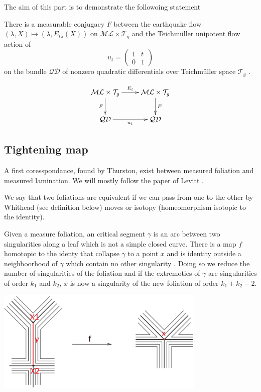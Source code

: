 The aim of this part is to demonstrate the followoing statement

\begin{thm}
\label{MirThm}
There is a measurable conjugacy $F$ between the earthquake flow $(\lambda , X) \mapsto (\lambda, E_{t \lambda}(X))$ on $\mathcal{ML}\times \mathcal{T}_g $ and the Teichmüller unipotent flow action of \[
u_t = \begin{pmatrix} 1 & t \\ 0 & 1 \end{pmatrix}
\]
on the bundle $\mathcal{QD}$ of nonzero quadratic differentials over Teichmüller space $\mathcal{T}_g$ .
\end{thm}

\[
\xymatrix{
  \mathcal{ML}\times \mathcal{T}_g  \ar[r]^{E_t} \ar[d]_F  & \mathcal{ML}\times \mathcal{T}_g \ar[d]^F \\
   \mathcal{QD} \ar[r]_{u_t} & \mathcal{QD}
 }
\]

\subsection{Tightening map}%

A first coresspondance, found by Thurston, exist between measured foliation and measured lamination. We will mostly follow the paper of Levitt \cite{levittfoliations}.

\begin{dfnt}
We say that two foliations are equivalent if we can pass from one to the other by Whithead (see definition below) moves or isotopy (homeomorphism isotopic to the identity).
\end{dfnt}


\begin{dfnt}
Given a measure foliation, an critical segment $\gamma$ is an arc between two singularities along a leaf which is not a simple closed curve.
There is a map $f$ homotopic to the identy that collapse $\gamma$ to a point $x$ and is identity outside a neighboorhood of $\gamma$ which contain no other singularity .  Doing so we reduce the number of singularities of the foliation and if the extremoties of $\gamma$ are singularities of order $k_1$ and $k_2$, $x$ is now a singularity of the new foliation of order $k_1+k_2-2$.
\end{dfnt}


\begin{center}
\includegraphics[width=10cm]{Image/Whitehead-move-collapsing-or-creating-an-arc-joining-two-singular-points.png}
\end{center}

